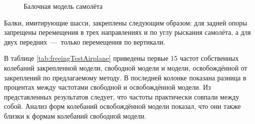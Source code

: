 \begin{figure}[!htb]
    \centerfloat
    \caption{Балочная модель самолёта} \label{fig:freeingAircraft}
\end{figure}

Балки, имитирующие шасси, закреплены следующим образом: для задней опоры запрещены перемещения в трех направлениях и по углу рыскания самолёта, а для двух передних~---~только перемещения по вертикали.

В таблице \ref{tab:freeingTestAirplane} приведены первые 15 частот собственных колебаний закрепленной модели, свободной модели и модели, освобождённой от закреплений по предлагаемому методу. В последней колонке показана разница в процентах между частотами свободной и освобождённой модели. Из представленных результатов следует, что частоты практически совпали между собой. Анализ форм колебаний освобождённой модели показал, что они также близки к формам колебаний свободной модели.


